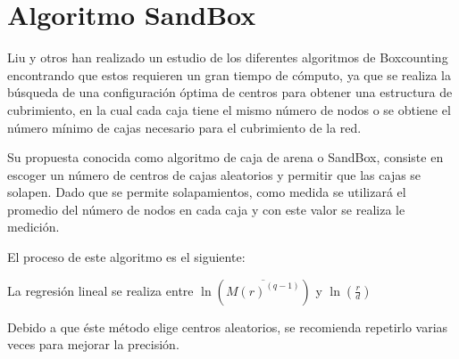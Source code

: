 \section{Algoritmo SandBox}
\label{cap4:seccionSB}

Liu y otros\cite{Liu2015} han realizado un estudio de los diferentes algoritmos de Boxcounting encontrando que estos requieren un gran tiempo de cómputo, ya que se realiza la búsqueda de una configuración óptima de centros para obtener una estructura de cubrimiento, en la cual cada caja tiene el mismo número de nodos o se obtiene el número mínimo de cajas necesario para el cubrimiento de la red.

Su propuesta conocida como algoritmo de caja de arena o SandBox, consiste en escoger un número de centros de cajas aleatorios y permitir que las cajas se solapen. Dado que se permite solapamientos, como medida se utilizará el promedio del número de nodos en cada caja y con este valor se realiza le medición.

El proceso de este algoritmo es el siguiente:


 La regresión lineal se realiza entre $\ln(\overline{M(r)^(q-1)})$ y $\ln(\frac{r}{d})$
 
Debido a que éste método elige centros aleatorios, se recomienda repetirlo varias veces para mejorar la precisión.
 

 